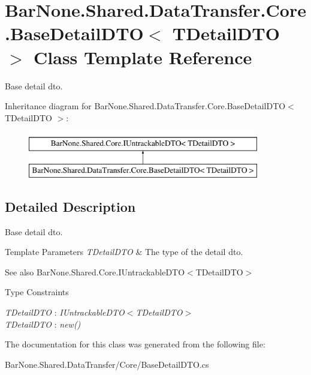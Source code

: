 \hypertarget{class_bar_none_1_1_shared_1_1_data_transfer_1_1_core_1_1_base_detail_d_t_o}{}\section{Bar\+None.\+Shared.\+Data\+Transfer.\+Core.\+Base\+Detail\+D\+TO$<$ T\+Detail\+D\+TO $>$ Class Template Reference}
\label{class_bar_none_1_1_shared_1_1_data_transfer_1_1_core_1_1_base_detail_d_t_o}


Base detail dto.  


Inheritance diagram for Bar\+None.\+Shared.\+Data\+Transfer.\+Core.\+Base\+Detail\+D\+TO$<$ T\+Detail\+D\+TO $>$\+:\begin{figure}[H]
\begin{center}
\leavevmode
\includegraphics[height=2.000000cm]{class_bar_none_1_1_shared_1_1_data_transfer_1_1_core_1_1_base_detail_d_t_o}
\end{center}
\end{figure}


\subsection{Detailed Description}
Base detail dto. 


\begin{DoxyTemplParams}{Template Parameters}
{\em T\+Detail\+D\+TO} & The type of the detail dto.\\
\hline
\end{DoxyTemplParams}
\begin{DoxySeeAlso}{See also}
Bar\+None.\+Shared.\+Core.\+I\+Untrackable\+D\+T\+O$<$\+T\+Detail\+D\+T\+O$>$


\end{DoxySeeAlso}
\begin{Desc}
\item[Type Constraints]\begin{description}
\item[{\em T\+Detail\+D\+TO} : {\em I\+Untrackable\+D\+TO$<$T\+Detail\+D\+TO$>$}]\item[{\em T\+Detail\+D\+TO} : {\em new()}]\end{description}
\end{Desc}


The documentation for this class was generated from the following file\+:\begin{DoxyCompactItemize}
\item 
Bar\+None.\+Shared.\+Data\+Transfer/\+Core/Base\+Detail\+D\+T\+O.\+cs\end{DoxyCompactItemize}
